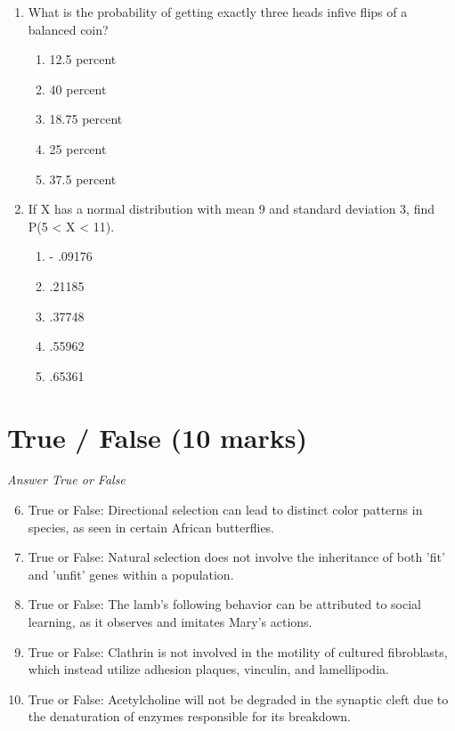 \documentclass[12pt]{article}
\begin{document}
\begin{enumerate}[label=\arabic*.]
\begin{enumerate}[label=(\alph*)]
\end{enumerate}
\item What is the probability of getting exactly three heads infive flips of a balanced coin?
\begin{enumerate}[label=(\alph*)]
    \item 12.5 percent
    \item 40 percent
    \item 18.75 percent
    \item 25 percent
    \item 37.5 percent
\end{enumerate}
\item If X has a normal distribution with mean 9 and standard deviation 3, find P(5 \textless{} X \textless{} 11).
\begin{enumerate}[label=(\alph*)]
    \item - .09176
    \item .21185
    \item .37748
    \item .55962
    \item .65361
\end{enumerate}
\end{enumerate}

\section*{True / False (10 marks)}
\textit{Answer True or False}
\begin{enumerate}[label=\arabic*.]
\setcounter{enumi}{5}
\item True or False: Directional selection can lead to distinct color patterns in species, as seen in certain African butterflies.
\item True or False: Natural selection does not involve the inheritance of both 'fit' and 'unfit' genes within a population.
\item True or False: The lamb's following behavior can be attributed to social learning, as it observes and imitates Mary's actions.
\item True or False: Clathrin is not involved in the motility of cultured fibroblasts, which instead utilize adhesion plaques, vinculin, and lamellipodia.
\item True or False: Acetylcholine will not be degraded in the synaptic cleft due to the denaturation of enzymes responsible for its breakdown.
\end{enumerate}
\end{document}

